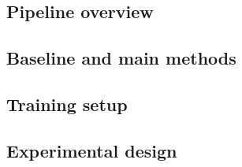 
\subsection{Pipeline overview}
\label{subsec:methodology-1}


\subsection{Baseline and main methods}
\label{subsec:methodology-2}


\subsection{Training setup}
\label{subsec:methodology-3}


\subsection{Experimental design}
\label{subsec:methodology-4}
